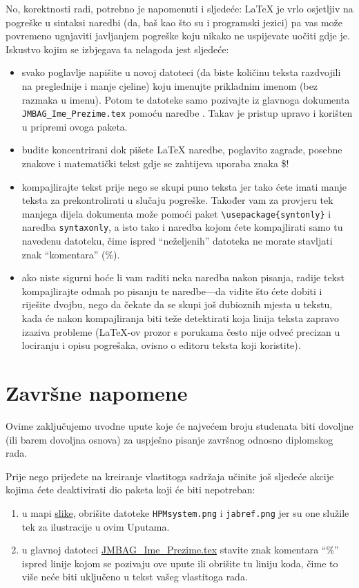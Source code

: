 No, korektnosti radi, potrebno je napomenuti i sljedeće: \LaTeX{} je vrlo osjetljiv na pogreške u sintaksi naredbi (da, baš kao što su i programski jezici) pa vas može povremeno ugnjaviti javljanjem pogreške koju nikako ne uspijevate uočiti gdje je. Iskustvo kojim se izbjegava ta nelagoda jest sljedeće:
\begin{itemize}
	\item svako poglavlje napišite u novoj datoteci (da biste količinu teksta razdvojili na preglednije i manje cjeline) koju imenujte prikladnim imenom (bez razmaka u imenu). Potom te datoteke samo pozivajte iz glavnoga dokumenta \verb|JMBAG_Ime_Prezime.tex| pomoću naredbe \verb||. Takav je pristup upravo i korišten u pripremi ovoga paketa.
	\item {\color{red} budite koncentrirani dok pišete \LaTeX{} naredbe, poglavito zagrade, posebne znakove i matematički tekst gdje se zahtijeva uporaba znaka \$!}
	\item kompajlirajte tekst prije nego se skupi puno teksta jer tako ćete imati manje teksta za prekontrolirati u slučaju pogreške. Također vam za provjeru tek manjega dijela dokumenta može pomoći paket \verb|\usepackage{syntonly}| i naredba \verb|syntaxonly|, a isto tako i naredba \verb|| kojom ćete kompajlirati samo tu navedenu datoteku, čime  ispred ``neželjenih'' datoteka ne morate stavljati znak ``komentara'' (\%).
	\item ako niste sigurni hoće li vam raditi neka naredba nakon pisanja, radije tekst kompajlirajte odmah po pisanju te naredbe---da vidite što ćete dobiti i riješite dvojbu, nego da čekate da se skupi još dubioznih mjesta u tekstu, kada će nakon kompajliranja biti teže detektirati koja linija teksta zapravo izaziva probleme (\LaTeX-ov prozor s porukama često nije odveć precizan u lociranju i opisu pogrešaka, ovisno o editoru teksta koji koristite).
\end{itemize}


\section{Završne napomene}
Ovime zaključujemo uvodne upute koje će najvećem broju studenata biti dovoljne (ili barem dovoljna osnova) za uspješno pisanje završnog odnosno diplomskog rada.

Prije nego prijeđete na kreiranje vlastitoga sadržaja učinite još sljedeće akcije kojima ćete deaktivirati dio paketa koji će biti nepotreban:
\begin{enumerate}
	\item u mapi \href{run:slike}{{\color{blue}slike}}, obrišite datoteke \verb|HPMsystem.png| i \verb|jabref.png| jer su one služile tek za ilustracije u ovim Uputama.
	\item u glavnoj datoteci  \href{run:JMBAG\_Ime\_Prezime.tex}{{\color{blue}JMBAG\_Ime\_Prezime.tex}} stavite znak komentara ``\%'' ispred linije \verb|| kojom se pozivaju ove upute ili obrišite tu liniju koda, čime to više neće biti uključeno u tekst vašeg vlastitoga rada.
\end{enumerate}

